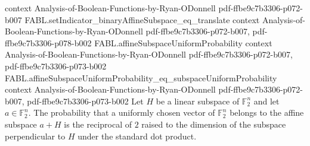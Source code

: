 \begin{theorem}
  {context}
  {Analysis-of-Boolean-Functions-by-Ryan-ODonnell}
  {pdf-ffbe9c7b3306-p072-b007}
\proofstep
  {FABL.setIndicator_binaryAffineSubspace_eq_translate}
  {context}
  {Analysis-of-Boolean-Functions-by-Ryan-ODonnell}
  {pdf-ffbe9c7b3306-p072-b007,
    pdf-ffbe9c7b3306-p078-b002}
\proofstep
  {FABL.affineSubspaceUniformProbability}
  {context}
  {Analysis-of-Boolean-Functions-by-Ryan-ODonnell}
  {pdf-ffbe9c7b3306-p072-b007,
    pdf-ffbe9c7b3306-p073-b002}
\proofstep
  {FABL.affineSubspaceUniformProbability_eq_subspaceUniformProbability}
  {context}
  {Analysis-of-Boolean-Functions-by-Ryan-ODonnell}
  {pdf-ffbe9c7b3306-p072-b007,
    pdf-ffbe9c7b3306-p073-b002}
Let $H$ be a linear subspace of $\mathbb F_2^n$ and let $a\in\mathbb F_2^n$. The
probability that a uniformly chosen vector of $\mathbb F_2^n$ belongs to the affine
subspace $a+H$ is the reciprocal of $2$ raised to the dimension of the subspace
perpendicular to $H$ under the standard dot product.
\end{theorem}

